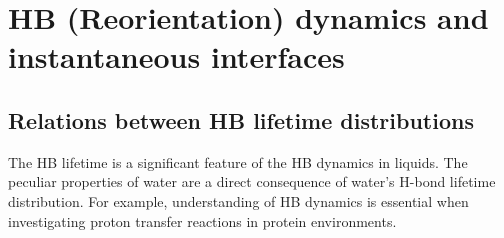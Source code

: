 \chapter{HB (Reorientation) dynamics and instantaneous interfaces}
\section{Relations between HB lifetime distributions}\label{relation_hbd}
The HB lifetime is a significant feature of the HB dynamics in liquids. 
The peculiar properties of water are a direct consequence of water's H-bond lifetime distribution.\cite{Lee2007,Sciortino1989,Sciortino1990prl} 
For example, understanding of HB dynamics is essential when investigating proton transfer reactions in protein environments.\cite{Ishikita2013}  
